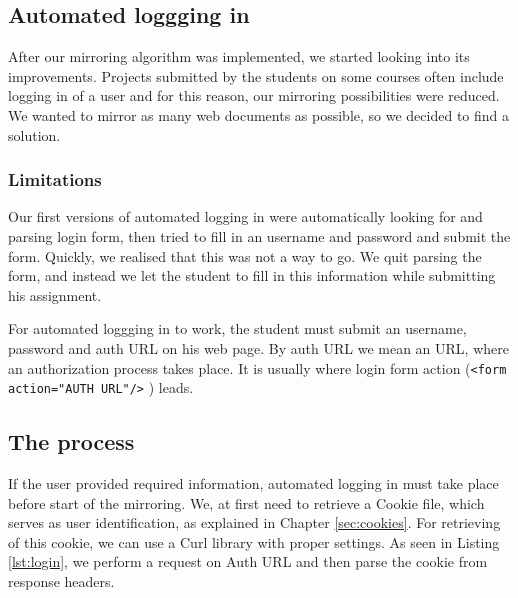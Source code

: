 
\subsection{Automated loggging in}
\label{sec:login}
After our mirroring algorithm was implemented, we started looking into its improvements. Projects submitted by the students on some courses often include logging in of a user and for this reason, our mirroring possibilities were reduced. We wanted to mirror as many web documents as possible, so we decided to find a solution.

\subsubsection{Limitations}
Our first versions of automated logging in were automatically looking for and parsing login form, then tried to fill in an username and password and submit the form. Quickly, we realised that this was not a way to go. We quit parsing the form, and instead we let the student to fill in this information while submitting his assignment.

For automated loggging in to work, the student must submit an username, password and auth URL on his web page. By auth URL we mean an URL, where an authorization process takes place. It is usually where login form action (\texttt{<form action="AUTH URL"/>} ) leads.

\subsection{The process}
If the user provided required information, automated logging in must take place before start of the mirroring. We, at first need to retrieve a Cookie file, which serves as user identification, as explained in Chapter \ref{sec:cookies}. For retrieving of this cookie, we can use a Curl library with proper settings. As seen in Listing \ref{lst:login}, we perform a request on Auth URL and then parse the cookie from response headers.

